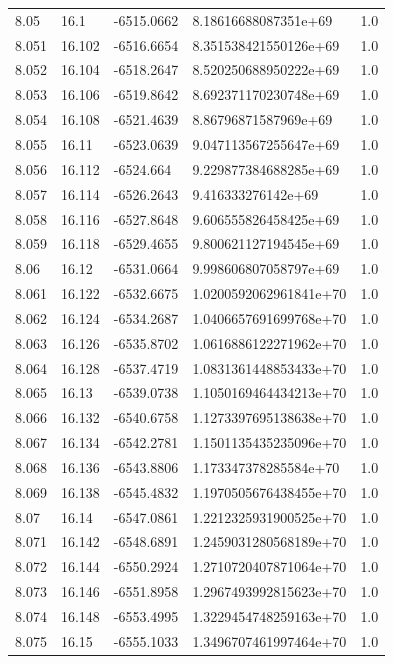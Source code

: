 \begin{tabular}{lllll}
8.05 & 16.1 & -6515.0662 & 8.18616688087351e+69 & 1.0 \\
8.051 & 16.102 & -6516.6654 & 8.351538421550126e+69 & 1.0 \\
8.052 & 16.104 & -6518.2647 & 8.520250688950222e+69 & 1.0 \\
8.053 & 16.106 & -6519.8642 & 8.692371170230748e+69 & 1.0 \\
8.054 & 16.108 & -6521.4639 & 8.86796871587969e+69 & 1.0 \\
8.055 & 16.11 & -6523.0639 & 9.047113567255647e+69 & 1.0 \\
8.056 & 16.112 & -6524.664 & 9.229877384688285e+69 & 1.0 \\
8.057 & 16.114 & -6526.2643 & 9.416333276142e+69 & 1.0 \\
8.058 & 16.116 & -6527.8648 & 9.606555826458425e+69 & 1.0 \\
8.059 & 16.118 & -6529.4655 & 9.800621127194545e+69 & 1.0 \\
8.06 & 16.12 & -6531.0664 & 9.998606807058797e+69 & 1.0 \\
8.061 & 16.122 & -6532.6675 & 1.0200592062961841e+70 & 1.0 \\
8.062 & 16.124 & -6534.2687 & 1.0406657691699768e+70 & 1.0 \\
8.063 & 16.126 & -6535.8702 & 1.0616886122271962e+70 & 1.0 \\
8.064 & 16.128 & -6537.4719 & 1.0831361448853433e+70 & 1.0 \\
8.065 & 16.13 & -6539.0738 & 1.1050169464434213e+70 & 1.0 \\
8.066 & 16.132 & -6540.6758 & 1.1273397695138638e+70 & 1.0 \\
8.067 & 16.134 & -6542.2781 & 1.1501135435235096e+70 & 1.0 \\
8.068 & 16.136 & -6543.8806 & 1.173347378285584e+70 & 1.0 \\
8.069 & 16.138 & -6545.4832 & 1.1970505676438455e+70 & 1.0 \\
8.07 & 16.14 & -6547.0861 & 1.2212325931900525e+70 & 1.0 \\
8.071 & 16.142 & -6548.6891 & 1.2459031280568189e+70 & 1.0 \\
8.072 & 16.144 & -6550.2924 & 1.2710720407871064e+70 & 1.0 \\
8.073 & 16.146 & -6551.8958 & 1.2967493992815623e+70 & 1.0 \\
8.074 & 16.148 & -6553.4995 & 1.3229454748259163e+70 & 1.0 \\
8.075 & 16.15 & -6555.1033 & 1.3496707461997464e+70 & 1.0 \\

\end{tabular}

